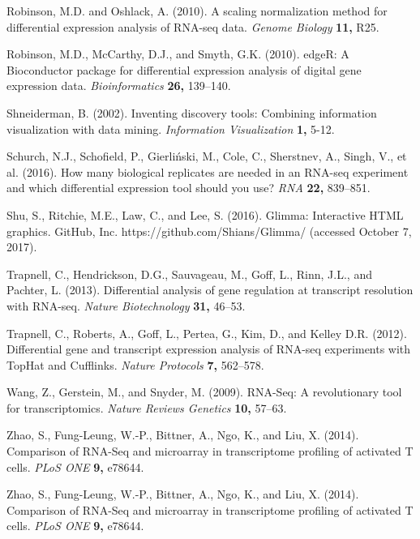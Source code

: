 \documentclass[useAMS,referee]{biom}
\begin{document}
\begin{thebibliography}{}
\bibitem{ } Robinson, M.D. and Oshlack, A. (2010). A scaling normalization method for differential expression analysis of RNA-seq data. \textit{Genome Biology} \textbf{11,} R25.

\bibitem{ } Robinson, M.D., McCarthy, D.J., and Smyth, G.K. (2010). edgeR: A Bioconductor package for differential expression analysis of digital gene expression data. \textit{Bioinformatics} \textbf{26,} 139–140.

\bibitem{ } Shneiderman, B. (2002). Inventing discovery tools: Combining information visualization with data mining. \textit{Information Visualization} \textbf{1,} 5-12.

\bibitem{ } Schurch, N.J., Schofield, P., Gierliński, M., Cole, C., Sherstnev, A., Singh, V., et al. (2016). How many biological replicates are needed in an RNA-seq experiment and which differential expression tool should you use? \textit{RNA} \textbf{22,} 839–851.

\bibitem{ } Shu, S., Ritchie, M.E., Law, C., and Lee, S. (2016). Glimma: Interactive HTML graphics. GitHub, Inc. https://github.com/Shians/Glimma/ (accessed October 7, 2017).

\bibitem{ } Trapnell, C., Hendrickson, D.G., Sauvageau, M., Goff, L., Rinn, J.L., and Pachter, L. (2013). Differential analysis of gene regulation at transcript resolution with RNA-seq. \textit{Nature Biotechnology} \textbf{31,} 46–53.

\bibitem{ } Trapnell, C., Roberts, A., Goff, L., Pertea, G., Kim, D., and Kelley D.R. (2012). Differential gene and transcript expression analysis of RNA-seq experiments with TopHat and Cufflinks. \textit{Nature Protocols} \textbf{7,} 562–578.

\bibitem{ } Wang, Z., Gerstein, M., and Snyder, M. (2009). RNA-Seq: A revolutionary tool for transcriptomics. \textit{Nature Reviews Genetics} \textbf{10,} 57–63.

\bibitem{ } Zhao, S., Fung-Leung, W.-P., Bittner, A., Ngo, K., and Liu, X. (2014). Comparison of RNA-Seq and microarray in transcriptome profiling of activated T cells. \textit{PLoS ONE} \textbf{9,} e78644.

\bibitem{ } Zhao, S., Fung-Leung, W.-P., Bittner, A., Ngo, K., and Liu, X. (2014). Comparison of RNA-Seq and microarray in transcriptome profiling of activated T cells. \textit{PLoS ONE} \textbf{9,} e78644.



\end{thebibliography}


\label{lastpage}
\end{document}

